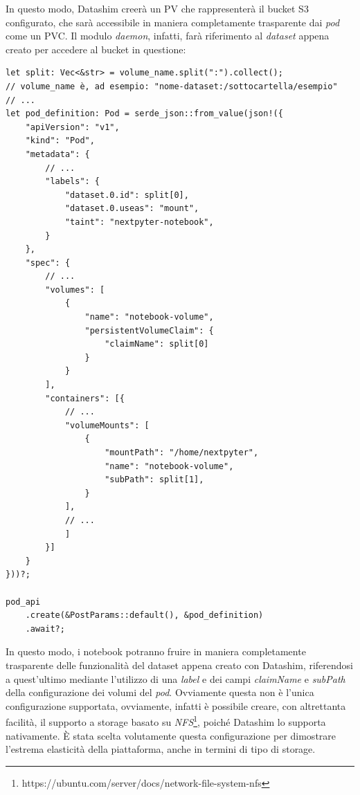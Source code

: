 In questo modo, Datashim creerà un PV che rappresenterà il bucket S3 configurato, che sarà accessibile in maniera completamente trasparente dai \textit{pod} come un PVC. Il modulo \textit{daemon}, infatti, farà riferimento al \textit{dataset} appena creato per accedere al bucket in questione:
\begin{verbatim}
let split: Vec<&str> = volume_name.split(":").collect();
// volume_name è, ad esempio: "nome-dataset:/sottocartella/esempio"
// ...
let pod_definition: Pod = serde_json::from_value(json!({
    "apiVersion": "v1",
    "kind": "Pod",
    "metadata": { 
        // ...
        "labels": {
            "dataset.0.id": split[0],
            "dataset.0.useas": "mount",
            "taint": "nextpyter-notebook",
        }
    },
    "spec": {
        // ... 
        "volumes": [
            {
                "name": "notebook-volume",
                "persistentVolumeClaim": {
                    "claimName": split[0]
                }
            }
        ],
        "containers": [{
            // ...
            "volumeMounts": [
                {
                    "mountPath": "/home/nextpyter",
                    "name": "notebook-volume",
                    "subPath": split[1],
                }
            ],
            // ...
            ]
        }] 
    }
}))?;

pod_api
    .create(&PostParams::default(), &pod_definition)
    .await?;
\end{verbatim}
In questo modo, i notebook potranno fruire in maniera completamente trasparente delle funzionalità del dataset appena creato con Datashim, riferendosi a quest'ultimo mediante l'utilizzo di una \textit{label} e dei campi \textit{claimName} e \textit{subPath} della configurazione dei volumi del \textit{pod}.
\newline
Ovviamente questa non è l'unica configurazione supportata, ovviamente, infatti è possibile creare, con altrettanta facilità, il supporto a storage basato su \textit{NFS}\footnote{https://ubuntu.com/server/docs/network-file-system-nfs}, poiché Datashim lo supporta nativamente. È stata scelta volutamente questa configurazione per dimostrare l'estrema elasticità della piattaforma, anche in termini di tipo di storage.
\newpage
